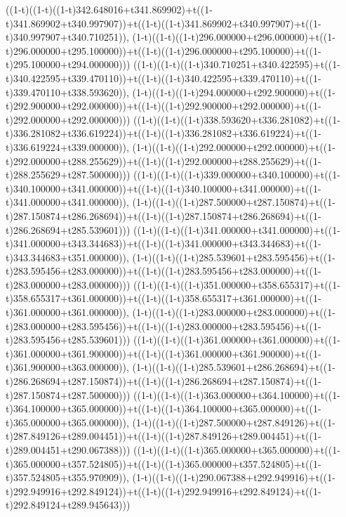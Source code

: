 ((1-t)((1-t)((1-t)342.648016+t341.869902)+t((1-t)341.869902+t340.997907))+t((1-t)((1-t)341.869902+t340.997907)+t((1-t)340.997907+t340.710251)),                                     (1-t)((1-t)((1-t)296.000000+t296.000000)+t((1-t)296.000000+t295.100000))+t((1-t)((1-t)296.000000+t295.100000)+t((1-t)295.100000+t294.000000)))
((1-t)((1-t)((1-t)340.710251+t340.422595)+t((1-t)340.422595+t339.470110))+t((1-t)((1-t)340.422595+t339.470110)+t((1-t)339.470110+t338.593620)),                                     (1-t)((1-t)((1-t)294.000000+t292.900000)+t((1-t)292.900000+t292.000000))+t((1-t)((1-t)292.900000+t292.000000)+t((1-t)292.000000+t292.000000)))
((1-t)((1-t)((1-t)338.593620+t336.281082)+t((1-t)336.281082+t336.619224))+t((1-t)((1-t)336.281082+t336.619224)+t((1-t)336.619224+t339.000000)),                                     (1-t)((1-t)((1-t)292.000000+t292.000000)+t((1-t)292.000000+t288.255629))+t((1-t)((1-t)292.000000+t288.255629)+t((1-t)288.255629+t287.500000)))
((1-t)((1-t)((1-t)339.000000+t340.100000)+t((1-t)340.100000+t341.000000))+t((1-t)((1-t)340.100000+t341.000000)+t((1-t)341.000000+t341.000000)),                                     (1-t)((1-t)((1-t)287.500000+t287.150874)+t((1-t)287.150874+t286.268694))+t((1-t)((1-t)287.150874+t286.268694)+t((1-t)286.268694+t285.539601)))
((1-t)((1-t)((1-t)341.000000+t341.000000)+t((1-t)341.000000+t343.344683))+t((1-t)((1-t)341.000000+t343.344683)+t((1-t)343.344683+t351.000000)),                                     (1-t)((1-t)((1-t)285.539601+t283.595456)+t((1-t)283.595456+t283.000000))+t((1-t)((1-t)283.595456+t283.000000)+t((1-t)283.000000+t283.000000)))
((1-t)((1-t)((1-t)351.000000+t358.655317)+t((1-t)358.655317+t361.000000))+t((1-t)((1-t)358.655317+t361.000000)+t((1-t)361.000000+t361.000000)),                                     (1-t)((1-t)((1-t)283.000000+t283.000000)+t((1-t)283.000000+t283.595456))+t((1-t)((1-t)283.000000+t283.595456)+t((1-t)283.595456+t285.539601)))
((1-t)((1-t)((1-t)361.000000+t361.000000)+t((1-t)361.000000+t361.900000))+t((1-t)((1-t)361.000000+t361.900000)+t((1-t)361.900000+t363.000000)),                                     (1-t)((1-t)((1-t)285.539601+t286.268694)+t((1-t)286.268694+t287.150874))+t((1-t)((1-t)286.268694+t287.150874)+t((1-t)287.150874+t287.500000)))
((1-t)((1-t)((1-t)363.000000+t364.100000)+t((1-t)364.100000+t365.000000))+t((1-t)((1-t)364.100000+t365.000000)+t((1-t)365.000000+t365.000000)),                                     (1-t)((1-t)((1-t)287.500000+t287.849126)+t((1-t)287.849126+t289.004451))+t((1-t)((1-t)287.849126+t289.004451)+t((1-t)289.004451+t290.067388)))
((1-t)((1-t)((1-t)365.000000+t365.000000)+t((1-t)365.000000+t357.524805))+t((1-t)((1-t)365.000000+t357.524805)+t((1-t)357.524805+t355.970909)),                                     (1-t)((1-t)((1-t)290.067388+t292.949916)+t((1-t)292.949916+t292.849124))+t((1-t)((1-t)292.949916+t292.849124)+t((1-t)292.849124+t289.945643)))
